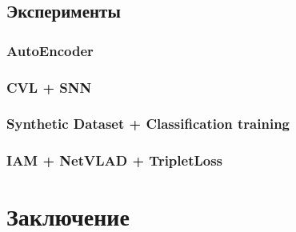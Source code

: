 \subsection{Эксперименты}  

\subsubsection{AutoEncoder}

\subsubsection{CVL + SNN}

\subsubsection{Synthetic Dataset + Classification training}

\subsubsection{IAM + NetVLAD + TripletLoss}

\newpage
\section{Заключение}